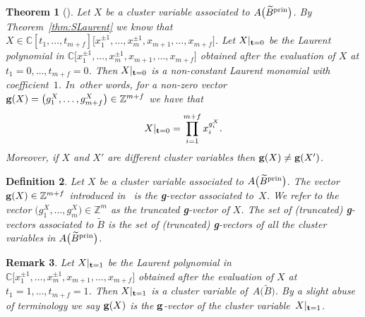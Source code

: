 \documentclass[pdftex]{sigma}%
\newtheorem{Theorem}{Theorem}[section]
\newtheorem{Definition}[Theorem]{Definition}
\newtheorem{Remark}[Theorem]{Remark}}
\numberwithin{equation}{section}
\begin{document}
\begin{Theorem}[{\cite[Theorem~1.7]{DWZ}}]
Let $X$ be a cluster variable associated to $A\big(\widetilde{B}^{\rm{prin}}\big)$.
By Theo\-rem~{\rm \ref{thm:SLaurent}} we know that $X\in \mathbb C [t_1,\dots ,t_{m+f}]\big[x_1^{\pm 1}, \dots , x_m^{\pm 1}, x_{m+1}, \dots , x_{m+f}\big]$.
Let $X|_{{\bf t}=0}$ be the Laurent polynomial in $\mathbb C \big[x_1^{\pm 1}, \dots , x_m^{\pm 1},x_{m+1}, \dots , x_{m+f}\big]$ obtained after the evaluation of $X$ at $t_1=0 ,\dots , t_{m+f}=0$. Then $X|_{{\bf t} = 0}$ is a non-constant Laurent monomial with coefficient~$1$. In~other words, for a non-zero vector ${\bf g}(X)=\big(g_1^X,\dots, g_{m+f}^X\big)\in \mathbb Z^{m+f}$ we have that
\begin{displaymath}
X|_{{\bf t}=0}=\prod_{i=1}^{m+f} x_i^{g^X_i}.
\end{displaymath}
Moreover, if $X$ and $X'$ are different cluster variables then ${\bf g }(X)\neq {\bf g}(X')$.
\end{Theorem}

\begin{Definition}
Let $X$ be a cluster variable associated to $A\big(\widetilde{B}^{\rm{prin}}\big)$. The vector ${\bf g}(X)\in \mathbb{Z}^{m+f}$ introduced in~ is the {\bf g}-{\it vector} associated to~$X$.
We refer to the vector $\big(g_1^X,\dots , g_m^X\big)\in \mathbb{Z}^m$ as the {\it truncated} {\bf g}-{\it vector} of $X$. The set of (truncated) {\bf g}-vectors associated to $\widetilde{B}$ is the set of (truncated) {\bf g}-vectors of all the cluster variables in $A\big(\widetilde{B}^{\rm{prin}}\big)$.
\end{Definition}

\begin{Remark}
Let $X|_{{\bf t}=1}$ be the Laurent polynomial in $\mathbb C \big[x_1^{\pm 1}, \dots , x_m^{\pm 1},x_{m+1}, \dots , x_{m+f}\big]$ obtai\-ned after the evaluation of $X$ at $t_1=1 ,\dots , t_{m+f}=1$. Then $X|_{{\bf t}=1}$ is a cluster variable of~$A\big(\widetilde{B}\big)$. By a slight abuse of terminology we say ${\bf g}(X)$ is the ${\bf g}$-vector of the cluster variable~$X|_{{\bf t}=1}$.
\end{Remark}
\end{document}
